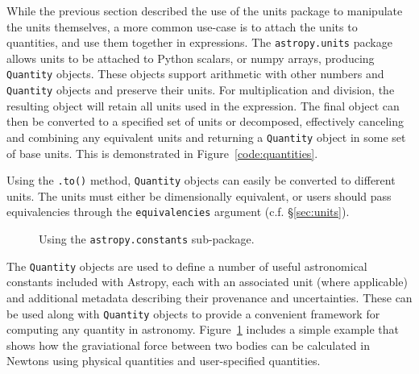 \documentclass[traditabstract]{aa}
\begin{document}
While the previous section described the use of the units package to
manipulate the units themselves, a more common use-case is to attach the units
to quantities, and use them together in expressions. The \texttt{astropy.units} package allows
units to be attached to Python scalars, or \gls{numpy} arrays, producing
\texttt{Quantity} objects. These objects support arithmetic with other numbers
and \texttt{Quantity} objects and preserve their units. For multiplication and
division, the resulting object will retain all units used in the expression.
The final object can then be converted to a specified set of units or
decomposed, effectively canceling and combining any equivalent units and
returning a \texttt{Quantity} object in some set of base units. This is
demonstrated in Figure~\ref{code:quantities}.

Using the \texttt{.to()} method, \texttt{Quantity} objects can easily be
converted to different units. The units must either be dimensionally
equivalent, or users should pass equivalencies through the
\texttt{equivalencies} argument (c.f. \S\ref{sec:units}).

\begin{figure}
\center
\caption{Using the \texttt{astropy.constants} sub-package.\label{code:constants}}
\vspace{0.1in}
\end{figure}

The \texttt{Quantity} objects are used to define
a number of useful astronomical constants included with Astropy, each with an
associated unit (where applicable) and additional metadata describing their
provenance and uncertainties. These can be used along with \texttt{Quantity}
objects to provide a convenient framework for computing any quantity in
astronomy. Figure~\ref{code:constants} includes a simple example that shows
how the graviational force between two bodies can be calculated in Newtons
using physical quantities and user-specified quantities.
\end{document}
